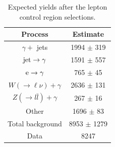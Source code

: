 \begin{table}[!hp]
\center
{
\begin{tabular}{|c|c|}
\hline
Process & Estimate \\
\hline
$\gamma +$ jets                          & 1994 $\pm$ 319 \\
${\rm jet}\rightarrow \gamma$            & 1591 $\pm$ 557 \\
${\rm e} \rightarrow \gamma$             & 765 $\pm$ 45  \\
$W(\to \ell\nu)+\gamma $                 & 2636 $\pm$ 131 \\
$Z( \to l \bar{l} )+\gamma    $          & 267 $\pm$ 16 \\
Other                                    & 1696 $\pm$ 83 \\
\hline
Total background                         & 8953 $\pm$ 1279 \\
\hline
Data                                     & 8247  \\
\hline
\end{tabular}
\caption{Expected yields after the lepton control region selections.}
\label{tab:WG_CRI}
}
\end{table}


